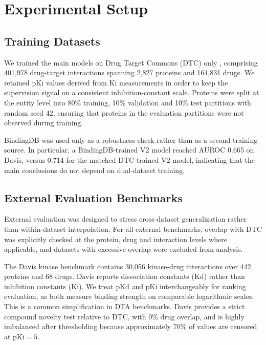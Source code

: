 \section{Experimental Setup}

\subsection{Training Datasets}

We trained the main models on Drug Target Commons (DTC) only \cite{tang2014dtc}, comprising 401,978 drug-target interactions spanning 2,827 proteins and 164,831 drugs. We retained pKi values derived from Ki measurements in order to keep the supervision signal on a consistent inhibition-constant scale. Proteins were split at the entity level into 80\% training, 10\% validation and 10\% test partitions with random seed 42, ensuring that proteins in the evaluation partitions were not observed during training.

BindingDB \cite{gilson2016bindingdb} was used only as a robustness check rather than as a second training source. In particular, a BindingDB-trained V2 model reached AUROC 0.665 on Davis, versus 0.714 for the matched DTC-trained V2 model, indicating that the main conclusions do not depend on dual-dataset training.

\subsection{External Evaluation Benchmarks}

External evaluation was designed to stress cross-dataset generalization rather than within-dataset interpolation. For all external benchmarks, overlap with DTC was explicitly checked at the protein, drug and interaction levels where applicable, and datasets with excessive overlap were excluded from analysis.

The Davis kinase benchmark \cite{davis2011kinase} contains 30,056 kinase-drug interactions over 442 proteins and 68 drugs. Davis reports dissociation constants (Kd) rather than inhibition constants (Ki). We treat pKd and pKi interchangeably for ranking evaluation, as both measure binding strength on comparable logarithmic scales. This is a common simplification in DTA benchmarks. Davis provides a strict compound novelty test relative to DTC, with 0\% drug overlap, and is highly imbalanced after thresholding because approximately 70\% of values are censored at pKi$=5$.

